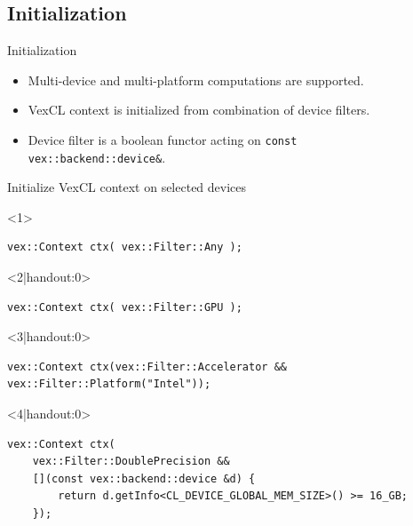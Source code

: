 \documentclass[@BEAMER_OPTIONS@]{beamer}
\newcommand{\code}[1]{\lstinline|#1|}
\begin{document}
\subsection{Initialization}
\begin{frame}[fragile]{Initialization}
    \begin{itemize}
        \item Multi-device and multi-platform computations are supported.
        \item VexCL context is initialized from combination of device filters.
        \item Device filter is a boolean functor acting on \code{const
            vex::backend::device&}.
    \end{itemize}
    \vspace{-0.5\baselineskip}
    \begin{overlayarea}{\textwidth}{0.4\textheight}
    \begin{exampleblock}{Initialize VexCL context on selected devices}
        \begin{onlyenv}<1>
        \begin{lstlisting}
vex::Context ctx( vex::Filter::Any );
        \end{lstlisting}
        \end{onlyenv}
        \begin{onlyenv}<2|handout:0>
        \begin{lstlisting}
vex::Context ctx( vex::Filter::GPU );
        \end{lstlisting}
        \end{onlyenv}
        \begin{onlyenv}<3|handout:0>
        \begin{lstlisting}
vex::Context ctx(vex::Filter::Accelerator && vex::Filter::Platform("Intel"));
        \end{lstlisting}
        \end{onlyenv}
        \begin{onlyenv}<4|handout:0>
        \begin{lstlisting}
vex::Context ctx(
    vex::Filter::DoublePrecision &&
    [](const vex::backend::device &d) {
        return d.getInfo<CL_DEVICE_GLOBAL_MEM_SIZE>() >= 16_GB;
    });
        \end{lstlisting}
        \end{onlyenv}
    \end{exampleblock}
    \end{overlayarea}

\end{frame}
\end{document}
